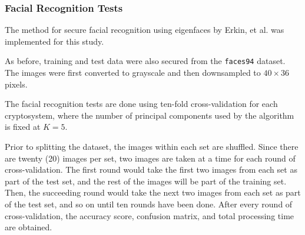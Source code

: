 \subsubsection{Facial Recognition Tests}
The method for secure facial recognition using eigenfaces by Erkin, et al. \cite{hutchison_privacy-preserving_2009} was implemented for this study.

As before, training and test data were also secured from the \texttt{faces94} dataset. The images were first converted to grayscale and then downsampled to $40 \times 36$ pixels.

The facial recognition tests are done using ten-fold cross-validation for each cryptosystem, where the number of principal components used by the algorithm is fixed at $K=5$.

Prior to splitting the dataset, the images within each set are shuffled. Since there are twenty (20) images per set, two images are taken at a time for each round of cross-validation. The first round would take the first two images from each set as part of the test set, and the rest of the images will be part of the training set. Then, the succeeding round would take the next two images from each set as part of the test set, and so on until ten rounds have been done. After every round of cross-validation, the accuracy score, confusion matrix, and total processing time are obtained.

